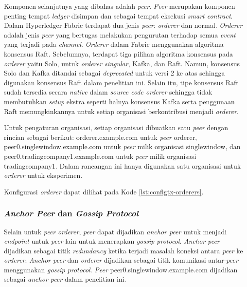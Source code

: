 Komponen selanjutnya yang dibahas adalah \textit{peer}. \textit{Peer} merupakan komponen penting tempat \textit{ledger} disimpan dan sebagai tempat eksekusi \textit{smart contract}. Dalam Hyperledger Fabric terdapat dua jenis \textit{peer}: \textit{orderer} dan normal. \textit{Orderer} adalah jenis \textit{peer} yang bertugas melakukan pengurutan terhadap semua \textit{event} yang terjadi pada \textit{channel}. \textit{Orderer} dalam Fabric menggunakan algoritma konsensus Raft. Sebelumnya, terdapat tiga pilihan algoritma konsensus pada \textit{orderer} yaitu Solo, untuk \textit{orderer singular}, Kafka, dan Raft. Namun, konsensus Solo dan Kafka ditandai sebagai \textit{deprecated} untuk versi 2 ke atas sehingga digunakan konsensus Raft dalam penelitian ini. Selain itu, tipe konsensus Raft sudah tersedia secara \textit{native} dalam \textit{source code orderer} sehingga tidak membutuhkan \textit{setup} ekstra seperti halnya konsensus Kafka serta penggunaan Raft memungkinkannya untuk setiap organisasi berkontribusi menjadi \textit{orderer}.

Untuk pengaturan organisasi, setiap organisasi dibuatkan satu \textit{peer} dengan rincian sebagai berikut: orderer.example.com untuk \textit{peer} orderer, peer0.singlewindow.example.com untuk \textit{peer} milik organisasi singlewindow, dan peer0.tradingcompany1.example.com untuk \textit{peer} milik organisasi tradingcompany1. Dalam rancangan ini hanya digunakan satu organisasi untuk \textit{orderer} untuk eksperimen.

Konfigurasi \textit{orderer} dapat dilihat pada Kode \ref{lst:configtx-orderers}. 



\subsubsection{\textit{Anchor Peer} dan \textit{Gossip Protocol}}
\label{subsubsec:anchor-peer}
Selain untuk \textit{peer} \textit{orderer}, \textit{peer} dapat dijadikan \textit{anchor peer} untuk menjadi \textit{endpoint} untuk \textit{peer} lain untuk menerapkan \textit{gossip protocol}. \textit{Anchor peer} dijadikan sebagai titik \textit{redundancy} ketika terjadi masalah koneksi antara \textit{peer} ke \textit{orderer}. \textit{Anchor peer} dan \textit{orderer} dijadikan sebagai titik komunikasi antar-\textit{peer} menggunakan \textit{gossip protocol}. \textit{Peer} peer0.singlewindow.example.com dijadikan sebagai \textit{anchor peer} dalam penelitian ini. 

